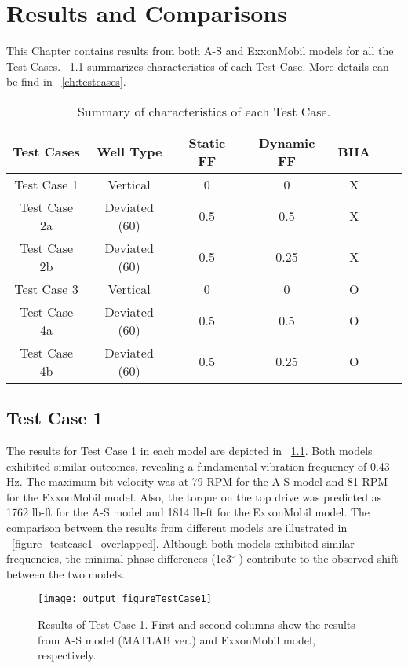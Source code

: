 \chapter{Results and Comparisons} 
\label{ch:results} 
This Chapter contains results from both A-S and ExxonMobil models for all the Test Cases. \tablename~\ref{Test_case_summary} summarizes characteristics of each Test Case. More details can be find in \chaptername~\ref{ch:testcases}.

\begin{table}
    \centering
    \begin{tabular}{|c|c|c|c|c|c|c|}
        \hline
        \textbf{Test Cases} & \textbf{Well Type} & \textbf{Static FF} & \textbf{Dynamic FF}& \textbf{BHA}\\
        \hline
        Test Case 1 & Vertical & 0 & 0 & X\\
        \hline
        Test Case 2a & Deviated (60\textdegree{}) & 0.5 & 0.5 & X \\
        \hline
        Test Case 2b & Deviated (60\textdegree{}) & 0.5 & 0.25 & X \\
        \hline
        Test Case 3 & Vertical & 0 & 0 & O\\                                                
        \hline
        Test Case 4a & Deviated (60\textdegree{}) & 0.5 & 0.5 & O \\                                                  
        \hline
        Test Case 4b & Deviated (60\textdegree{}) & 0.5 & 0.25 & O \\                                                     
        \hline
    \end{tabular}
    \caption[Summary of characteristics of each Test Case]{Summary of characteristics of each Test Case.}
    \label{Test_case_summary}
\end{table} 

 
\section{Test Case 1}
The results for Test Case 1 in each model are depicted in \figurename~\ref{figure_testcase1}. Both models exhibited similar outcomes, revealing a fundamental vibration frequency of 0.43 Hz. The maximum bit velocity was at 79 RPM for the A-S model and 81 RPM for the ExxonMobil model. Also, the torque on the top drive was predicted as 1762 lb-ft for the A-S model and 1814 lb-ft for the ExxonMobil model. The comparison between the results from different models are illustrated in \figurename~\ref{figure_testcase1_overlapped}. Although both models exhibited similar frequencies, the minimal phase differences (1e3$^{\circ}$ ) contribute to the observed shift between the two models.
\begin{figure}
  \centering
  \texttt{[image: output\_figureTestCase1]}
  \caption[Results of Test Case 1]{Results of Test Case 1. First and second columns show the results from A-S model (MATLAB ver.) and ExxonMobil model, respectively.}\label{figure_testcase1}
\end{figure}

